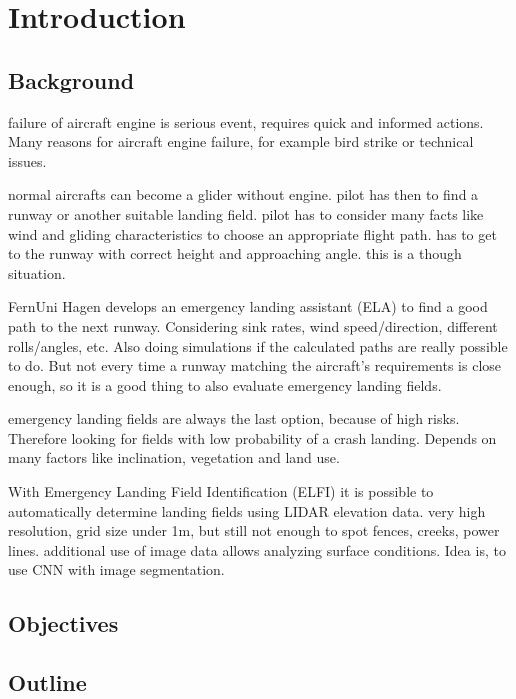 \section{Introduction}

\subsection{Background}
\cite{feu_fas}
failure of aircraft engine is serious event, requires quick and informed actions. Many reasons for aircraft engine failure, for example bird strike or technical issues.

normal aircrafts can become a glider without engine. pilot has then to find a runway or another suitable landing field. pilot has to consider many facts like wind and gliding characteristics to choose an appropriate flight path. has to get to the runway with correct height and approaching angle. this is a though situation.

FernUni Hagen develops an emergency landing assistant (ELA) to find a good path to the next runway. Considering sink rates, wind speed/direction, different rolls/angles, etc. Also doing simulations if the calculated paths are really possible to do. But not every time a runway matching the aircraft's requirements is close enough, so it is a good thing to also evaluate emergency landing fields.


\cite{feu_elfi}
emergency landing fields are always the last option, because of high risks. Therefore looking for fields with low probability of a crash landing. Depends on many factors like inclination, vegetation and land use.

With Emergency Landing Field Identification (ELFI) it is possible to automatically determine landing fields using LIDAR elevation data. very high resolution, grid size under 1m, but still not enough to spot fences, creeks, power lines. additional use of image data allows analyzing surface conditions. Idea is, to use CNN with image segmentation.

\subsection{Objectives}

\subsection{Outline}

\newpage